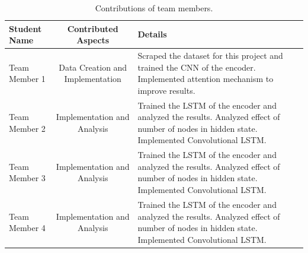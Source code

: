 \documentclass[10pt,twocolumn,letterpaper]{article}
\begin{document}
\newpage
\newpage

														 
{\small


}

\begin{table}
\begin{center}			  
\begin{tabular}{|l|c|p{8cm}|}
\hline
Student Name & Contributed Aspects & Details \\
\hline\hline
Team Member 1 & Data Creation and Implementation & Scraped the dataset for this project and trained the CNN of the encoder. Implemented attention mechanism to improve results. \\
Team Member 2 & Implementation and Analysis & Trained the LSTM of the encoder and analyzed the results. Analyzed effect of number of nodes in hidden state.  Implemented Convolutional LSTM. \\
Team Member 3 & Implementation and Analysis & Trained the LSTM of the encoder and analyzed the results. Analyzed effect of number of nodes in hidden state.  Implemented Convolutional LSTM. \\
Team Member 4 & Implementation and Analysis & Trained the LSTM of the encoder and analyzed the results. Analyzed effect of number of nodes in hidden state.  Implemented Convolutional LSTM. \\
\hline
\end{tabular}
\end{center}
\caption{Contributions of team members.}
\label{tab:contributions}
\end{table}
\end{document}
